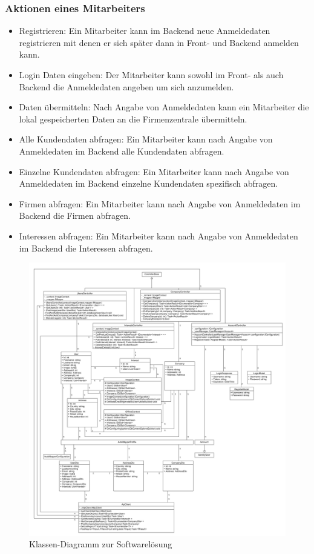 \subsubsection{Aktionen eines Mitarbeiters}
\begin{itemize}
	\item Registrieren: Ein Mitarbeiter kann im Backend neue Anmeldedaten registrieren mit denen er sich später dann in Front- und Backend anmelden kann.
	\item Login Daten eingeben: Der Mitarbeiter kann sowohl im Front- als auch Backend die Anmeldedaten angeben um sich anzumelden.
	\item Daten übermitteln: Nach Angabe von Anmeldedaten kann ein Mitarbeiter die lokal gespeicherten Daten an die Firmenzentrale übermitteln.
	\item Alle Kundendaten abfragen: Ein Mitarbeiter kann nach Angabe von Anmeldedaten im Backend alle Kundendaten abfragen.
	\item Einzelne Kundendaten abfragen: Ein Mitarbeiter kann nach Angabe von Anmeldedaten im Backend einzelne Kundendaten spezifisch abfragen.
	\item Firmen abfragen: Ein Mitarbeiter kann nach Angabe von Anmeldedaten im Backend die Firmen abfragen.
	\item Interessen abfragen: Ein Mitarbeiter kann nach Angabe von Anmeldedaten im Backend die Interessen abfragen.
\end{itemize}
\newpage

\begin{figure}[h]
	\centering
	\includegraphics[width=1.1\linewidth]{Images/Projekt_Messe_Class2}
	\caption{Klassen-Diagramm zur Softwarelösung}
	\label{fig:projektmesseclass}
\end{figure}

